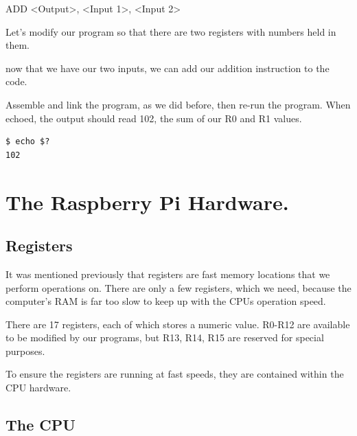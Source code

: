 \documentclass[a4paper, twocolumn, twoside, 11pt]{article}
\begin{document}
			ADD <Output>, <Input 1>, <Input 2>
		
			Let's modify our program so that there are two registers with numbers held in them.
		
			
		
			now that we have our two inputs, we can add our addition instruction to the code.
		
			
		
			Assemble and link the program, as we did before, then re-run the program. When echoed, the output should read 102, the sum of our R0 and R1 values.
		
			\begin{lstlisting}
$ echo $?
102
			\end{lstlisting}
		
	\section{The Raspberry Pi Hardware.}
	
		\subsection*{Registers}
	
			It was mentioned previously that registers are fast memory locations that we perform operations on. There are only a few registers, which we need, because the computer's RAM is far too slow to keep up with the CPUs operation speed.
		
			There are 17 registers, each of which stores a numeric value. R0-R12 are available to be modified by our programs, but R13, R14, R15 are reserved for special purposes.
			
			To ensure the registers are running at fast speeds, they are contained within the CPU hardware.
	
		\subsection*{The CPU}
		
\end{document}
